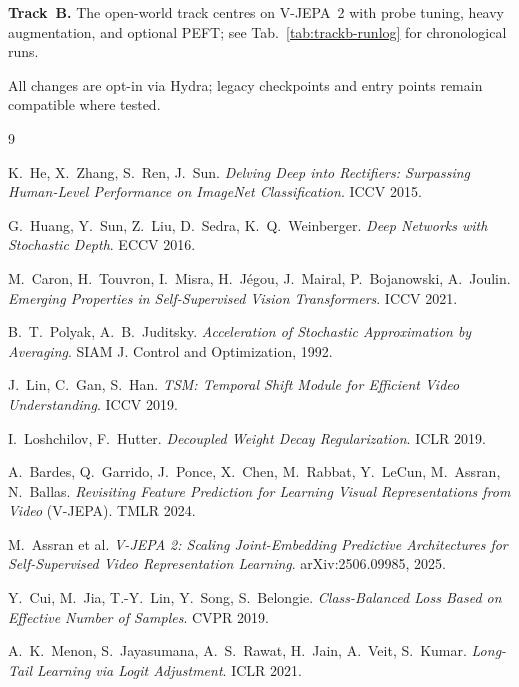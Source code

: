 \documentclass[11pt,a4paper]{article}
\begin{document}
\textbf{Track~B.} The open-world track centres on V-JEPA~2 with probe tuning,
heavy augmentation, and optional PEFT; see Tab.~\ref{tab:trackb-runlog} for
chronological runs.

All changes are opt-in via Hydra; legacy checkpoints and entry points remain
compatible where tested.

\clearpage
\appendix
\renewcommand{\trackcolor}{trackred}
\renewcommand{\trackname}{Track~A appendix}

\clearpage
\renewcommand{\trackcolor}{black}
\renewcommand{\trackname}{Report}

\begin{thebibliography}{9}

K.~He, X.~Zhang, S.~Ren, J.~Sun.
\newblock \emph{Delving Deep into Rectifiers: Surpassing Human-Level
              Performance on ImageNet Classification}.
\newblock ICCV 2015.

G.~Huang, Y.~Sun, Z.~Liu, D.~Sedra, K.~Q.~Weinberger.
\newblock \emph{Deep Networks with Stochastic Depth}.
\newblock ECCV 2016.

M.~Caron, H.~Touvron, I.~Misra, H.~J\'egou, J.~Mairal, P.~Bojanowski,
A.~Joulin.
\newblock \emph{Emerging Properties in Self-Supervised Vision
              Transformers}.
\newblock ICCV 2021.

B.~T.~Polyak, A.~B.~Juditsky.
\newblock \emph{Acceleration of Stochastic Approximation by Averaging}.
\newblock SIAM J. Control and Optimization, 1992.

J.~Lin, C.~Gan, S.~Han.
\newblock \emph{TSM: Temporal Shift Module for Efficient Video
              Understanding}.
\newblock ICCV 2019.

I.~Loshchilov, F.~Hutter.
\newblock \emph{Decoupled Weight Decay Regularization}.
\newblock ICLR 2019.

A.~Bardes, Q.~Garrido, J.~Ponce, X.~Chen, M.~Rabbat, Y.~LeCun, M.~Assran,
N.~Ballas.
\newblock \emph{Revisiting Feature Prediction for Learning Visual
              Representations from Video} (V-JEPA).
\newblock TMLR 2024.

M.~Assran et al.
\newblock \emph{V-JEPA 2: Scaling Joint-Embedding Predictive Architectures
              for Self-Supervised Video Representation Learning}.
\newblock arXiv:2506.09985, 2025.

Y.~Cui, M.~Jia, T.-Y.~Lin, Y.~Song, S.~Belongie.
\newblock \emph{Class-Balanced Loss Based on Effective Number of
              Samples}.
\newblock CVPR 2019.

A.~K.~Menon, S.~Jayasumana, A.~S.~Rawat, H.~Jain, A.~Veit, S.~Kumar.
\newblock \emph{Long-Tail Learning via Logit Adjustment}.
\newblock ICLR 2021.

\end{thebibliography}
\end{document}

